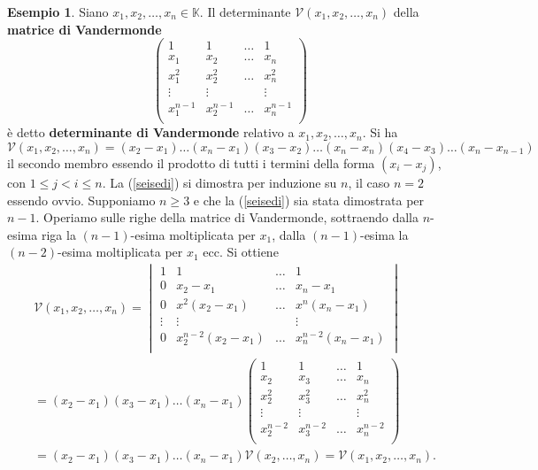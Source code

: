 \documentclass{article}
\theoremstyle{plain}
\theoremstyle{definition}
\newtheorem{exmp}{Esempio}[section]
\theoremstyle{remark}
\begin{document}
\begin{exmp}
    Siano $x_1,x_2,\ldots,x_n\in\mathbb{K}$. Il determinante $\mathcal{V}(x_1,x_2,\ldots,x_n)$ della \textbf{matrice di Vandermonde}
    \[\begin{pmatrix}
        1&1&\dots&1\\
        x_1&x_2&\dots&x_n\\
        x^2_1&x^2_2&\dots&x^2_n\\
        \vdots&\vdots&&\vdots\\
        x^{n-1}_1&x^{n-1}_2&\dots&x^{n-1}_n\\
    \end{pmatrix}\]
    è detto \textbf{determinante di Vandermonde} relativo a $x_1, x_2, \ldots, x_n$.
    Si ha 
    \begin{equation}
        \mathcal{V}(x_1,x_2,\ldots,x_n)=(x_2-x_1)\ldots(x_n-x_1)(x_3-x_2)\ldots(x_n-x_n)(x_4-x_3)\ldots(x_n-x_{n-1})\label{seisedi}
    \end{equation}
    il secondo membro essendo il prodotto di tutti i termini della forma $(x_i-x_j)$, con $1\leq j<i\leq n$.
    La (\ref{seisedi}) si dimostra per induzione su $n$, il caso $n=2$ essendo ovvio. Supponiamo $n\geq 3$ e che la (\ref{seisedi}) sia stata dimostrata per $n-1$. 
    Operiamo sulle righe della matrice di Vandermonde, sottraendo dalla $n$-esima riga la $(n-1)$-esima moltiplicata per $x_1$, dalla $(n-1)$-esima la $(n-2)$-esima moltiplicata per $x_1$ ecc. Si ottiene
    \begin{align*}
        &\mathcal{V}(x_1,x_2,\ldots,x_n)=
        \begin{vmatrix}
            1&1&\dots&1\\
            0&x_2-x_1&\dots&x_n-x_1\\
            0&x^2(x_2-x_1)&\dots&x^n(x_n-x_1)\\
            \vdots&\vdots&&\vdots\\
            0&x_2^{n-2}(x_2-x_1)&\dots&x_n^{n-2}(x_n-x_1)\\
        \end{vmatrix}\\
        &=(x_2-x_1)(x_3-x_1)\ldots(x_n-x_1)\begin{pmatrix}
            1&1&\dots&1\\
            x_2&x_3&\dots&x_n\\
            x^2_2&x^2_3&\dots&x^2_n\\
            \vdots&\vdots&&\vdots\\
            x^{n-2}_2&x^{n-2}_3&\dots&x^{n-2}_n\\
        \end{pmatrix}\\
        &=(x_2-x_1)(x_3-x_1)\ldots(x_n-x_1)\mathcal{V}(x_2,\ldots,x_n)=\mathcal{V}(x_1,x_2,\ldots,x_n).\\
    \end{align*}
\end{exmp}
\end{document}

